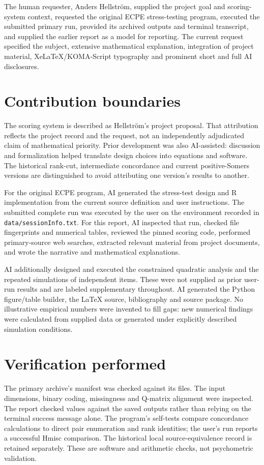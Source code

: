 \documentclass[11pt,a4paper,oneside,headings=normal,parskip=half]{scrreprt}
\newcommand{\code}[1]{\nolinkurl{#1}}
\begin{document}
The human requester, Anders Hellström, supplied the project goal and scoring-system context, requested the original ECPE stress-testing program, executed the submitted primary run, provided its archived outputs and terminal transcript, and supplied the earlier report as a model for reporting. The current request specified the subject, extensive mathematical explanation, integration of project material, XeLaTeX/KOMA-Script typography and prominent short and full AI disclosures.

\section{Contribution boundaries}
The scoring system is described as Hellström's project proposal. That attribution reflects the project record and the request, not an independently adjudicated claim of mathematical priority. Prior development was also AI-assisted: discussion and formalization helped translate design choices into equations and software. The historical rank-cut, intermediate concordance and current positive-Somers versions are distinguished to avoid attributing one version's results to another.

For the original ECPE program, AI generated the stress-test design and R implementation from the current source definition and user instructions. The submitted complete run was executed by the user on the environment recorded in \code{data/sessionInfo.txt}. For this report, AI inspected that run, checked file fingerprints and numerical tables, reviewed the pinned scoring code, performed primary-source web searches, extracted relevant material from project documents, and wrote the narrative and mathematical explanations.

AI additionally designed and executed the constrained quadratic analysis and the repeated simulations of independent items. These were not supplied as prior user-run results and are labeled supplementary throughout. AI generated the Python figure/table builder, the LaTeX source, bibliography and source package. No illustrative empirical numbers were invented to fill gaps: new numerical findings were calculated from supplied data or generated under explicitly described simulation conditions.

\section{Verification performed}
The primary archive's manifest was checked against its files. The input dimensions, binary coding, missingness and Q-matrix alignment were inspected. The report checked values against the saved outputs rather than relying on the terminal success message alone. The program's self-tests compare concordance calculations to direct pair enumeration and rank identities; the user's run reports a successful Hmisc comparison. The historical local source-equivalence record is retained separately. These are software and arithmetic checks, not psychometric validation.
\end{document}
